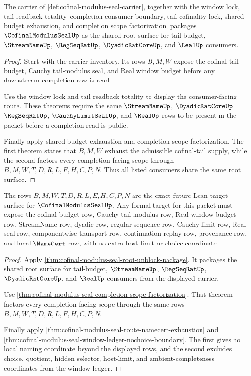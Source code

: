 \begin{theorem}
\label{thm:cofinal-modulus-seal-root-unblock-package}
The carrier of \autoref{def:cofinal-modulus-seal-carrier}, together with the window lock, tail readback totality, completion consumer boundary, tail cofinality lock, shared budget exhaustion, and completion scope factorization, packages $\CofinalModulusSealUp$ as the shared root surface for tail-budget, $\StreamNameUp$, $\RegSeqRatUp$, $\DyadicRatCoreUp$, and $\RealUp$ consumers.
\end{theorem}
\begin{proof}
Start with the carrier inventory. Its rows $B,M,W$ expose the cofinal tail budget, Cauchy tail-modulus seal, and Real window budget before any downstream completion row is read.

Use the window lock and tail readback totality to display the consumer-facing route. These theorems require the same $\StreamNameUp$, $\DyadicRatCoreUp$, $\RegSeqRatUp$, $\CauchyLimitSealUp$, and $\RealUp$ rows to be present in the packet before a completion read is public.

Finally apply shared budget exhaustion and completion scope factorization. The first theorem states that $B,M,W$ exhaust the admissible cofinal-tail supply, while the second factors every completion-facing scope through $B,M,W,T,D,R,L,E,H,C,P,N$. Thus all listed consumers share the same root surface.
\end{proof}

\begin{theorem}
\label{thm:cofinal-modulus-seal-formal-target-handoff}
The rows $B,M,W,T,D,R,L,E,H,C,P,N$ are the exact future Lean target surface for $\CofinalModulusSealUp$. Any formal target for this packet must expose the cofinal budget row, Cauchy tail-modulus row, Real window-budget row, StreamName row, dyadic row, regular-sequence row, Cauchy-limit row, Real seal row, componentwise transport row, continuation replay row, provenance row, and local $\NameCert$ row, with no extra host-limit or choice coordinate.
\end{theorem}
\begin{proof}
Apply \autoref{thm:cofinal-modulus-seal-root-unblock-package}. It packages the shared root surface for tail-budget, $\StreamNameUp$, $\RegSeqRatUp$, $\DyadicRatCoreUp$, and $\RealUp$ consumers from the displayed carrier.

Use \autoref{thm:cofinal-modulus-seal-completion-scope-factorization}. That theorem factors every completion-facing scope through the same rows $B,M,W,T,D,R,L,E,H,C,P,N$.

Finally apply \autoref{thm:cofinal-modulus-seal-route-namecert-exhaustion} and \autoref{thm:cofinal-modulus-seal-window-ledger-nochoice-boundary}. The first gives no local naming coordinate beyond the displayed rows, and the second excludes choice, quotient, hidden selector, host-limit, and ambient-completeness coordinates from the window ledger.
\end{proof}

